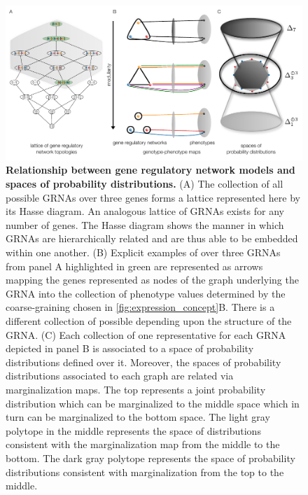 \begin{figure}[!ht]
\centering
\noindent\includegraphics[width=0.9\columnwidth]{fig/conediagram.pdf}
\caption{{\bf Relationship between gene regulatory network models and spaces of probability distributions.} (A) The collection of all possible GRNAs over three genes forms a lattice represented here by its Hasse diagram. An analogous lattice of GRNAs exists for any number of genes. The Hasse diagram shows the manner in which GRNAs are hierarchically related and are thus able to be embedded within one another. (B) Explicit examples of \gnpm{} over three GRNAs from panel A highlighted in green are represented as arrows mapping the genes represented as nodes of the graph underlying the GRNA into the collection of phenotype values determined by the coarse-graining chosen in \ref{fig:expression_concept}B. There is a different collection of possible \gnpm{} depending upon the structure of the GRNA. (C) Each collection of \gnpm{} one representative for each GRNA depicted in panel B is associated to a space of probability distributions defined over it. Moreover, the spaces of probability distributions associated to each graph are related via marginalization maps. The top represents a joint probability distribution which can be marginalized to the middle space which in turn can be marginalized to the bottom space. The light gray polytope in the middle represents the space of distributions consistent with the marginalization map from the middle to the bottom. The dark gray polytope represents the space of probability distributions consistent with marginalization from the top to the middle.}
\label{fig:conediagram}
\end{figure}

